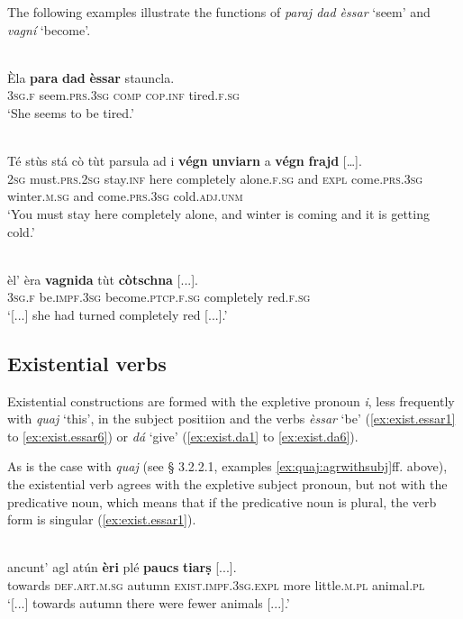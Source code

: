 The following examples illustrate the functions of \textit{paraj dad èssar} `seem' and \textit{vagní} `become'.

\ea
\label{ex:cop:7}
\\
\gll Èla \textbf{para} \textbf{dad} \textbf{èssar} stauncla.   \\
\textsc{3sg.f} seem.\textsc{prs.3sg} \textsc{comp} \textsc{cop.inf} tired.\textsc{f.sg} \\
\glt `She seems to be tired.'
\z

\ea
\label{ex:cop:8}
 {\citealt[145]{Büchli1966}}\\
\gll    Té stùs stá cò tùt parsula ad i \textbf{végn} \textbf{unviarn} a \textbf{végn} \textbf{frajd} […].\\
    \textsc{2sg} must.\textsc{prs.2sg} stay.\textsc{inf} here completely alone.\textsc{f.sg} and \textsc{expl} come.\textsc{prs.3sg} winter.\textsc{m.sg} and come.\textsc{prs.3sg} cold.\textsc{adj.unm}  \\
\glt `You must stay here completely alone, and winter is coming and it is getting cold.'
\z

\ea
\label{ex:cop:9}
\\
\gll  [...] èl’ èra \textbf{vagnida} tùt \textbf{còtschna} [...].\\
{} \textsc{3sg.f} be.\textsc{impf.3sg} become.\textsc{ptcp.f.sg} completely red.\textsc{f.sg}\\
\glt `[...] she had turned completely red [...].'
\z

\subsection{Existential verbs}
Existential constructions are formed with the expletive pronoun \textit{i}, less frequently with \textit{quaj} `this', in the subject positiion and the verbs \textit{èssar} `be' (\ref{ex:exist.essar1} to \ref{ex:exist.essar6}) or \textit{dá} `give' (\ref{ex:exist.da1} to \ref{ex:exist.da6}).

As is the case with \textit{quaj} (see § 3.2.2.1, examples \ref{ex:quaj:agrwithsubj}ff. above), the existential verb agrees with the expletive subject pronoun, but not with the predicative noun, which means that if the predicative noun is plural, the verb form is singular (\ref{ex:exist.essar1}).

\ea
\label{ex:exist.essar1}
\\
\gll [...] ancunt’ agl atún \textbf{èri} plé \textbf{paucs} \textbf{tiarṣ} [...].\\
 {} towards \textsc{def.art.m.sg} autumn \textsc{exist.impf.3sg.expl} more little.\textsc{m.pl} animal.\textsc{pl} \\
\glt `[...] towards autumn there were fewer animals [...].'
\z

